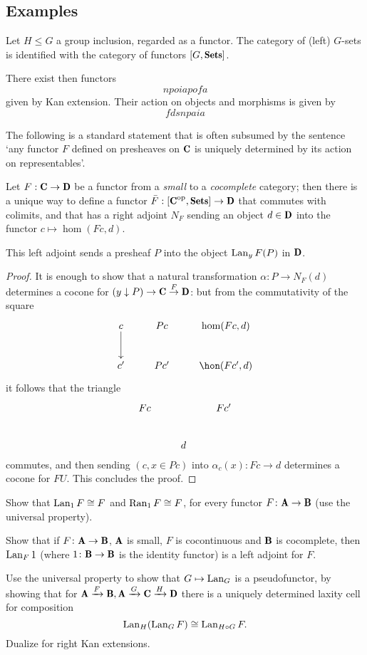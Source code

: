 \documentclass[a4paper,12pt]{amsart}
\begin{document}
\subsection{Examples}
\begin{example}
Let $H\le G$ a group inclusion, regarded as a functor. The category of (left) $G$-sets is identified with the category of functors $[G,\Sets]$. 

There exist then functors
\[
npoiapofa
\]
given by Kan extension. Their action on objects and morphisms is given by
\[
fdsnpaia
\]
\end{example}
The following is a standard statement that is often subsumed by the sentence `any functor $F$ defined on presheaves on $\C$ is uniquely determined by its action on representables'.
\begin{example}
Let $F:\C \to \D$ be a functor from a \emph{small} to a \emph{cocomplete} category; then there is a unique way to define a functor $\bar F : [\C^\text{op}, \Sets] \to \D$ that commutes with colimits, and that has a right adjoint $N_F$ sending an object $d\in\D$ into the functor $c\mapsto \hom(Fc,d)$. 

This left adjoint sends a presheaf $P$ into the object $\operatorname{Lan}_yF(P)$ in $\D$.
\end{example}
\begin{proof}
It is enough to show that a natural transformation $\alpha\colon P \to N_F(d)$ determines a cocone for $(y\downarrow P) \to \C \overset{F}\to \D$: but from the commutativity of the square
\[
\xymatrix{
	c \ar[d]&  Pc & \hom(Fc,d)\\
	c' & Pc' & \hon(Fc',d)
}
\]
it follows that the triangle
\[
\xymatrix{
	Fc && Fc' \\
	&d&
}
\]
commutes, and then sending $(c, x\in Pc)$ into $\alpha_c(x) \colon Fc \to d$ determines a cocone for $FU$. This concludes the proof.
\end{proof}
\begin{exercise}
Show that $\operatorname{Lan}_1F\cong F$ and $\operatorname{Ran}_1F\cong F$, for every functor $F\colon \A\to \B$ (use the universal property).
\end{exercise}
\begin{exercise}
Show that if $F\colon \A\to\B$, $\A$ is small, $F$ is cocontinuous and $\B$ is cocomplete, then $\operatorname{Lan}_F1$ (where $1\colon \B\to\B$ is the identity functor) is a left adjoint for $F$.
\end{exercise}
\begin{exercise}
Use the universal property to show that $G\mapsto \operatorname{Lan}_G$ is a pseudofunctor, by showing that for $\A\xto{F}\B, \A\xto{G}\C\xto{H}\D$ there is a uniquely determined laxity cell for composition
\[
\operatorname{Lan}_H(\operatorname{Lan}_GF)\cong \operatorname{Lan}_{H\circ G}F.
\]
Dualize for right Kan extensions.
\end{exercise}
\end{document}
